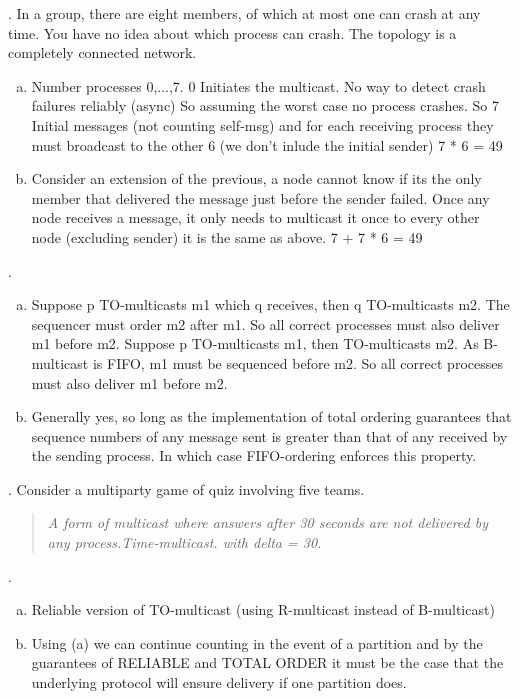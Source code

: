 \documentclass[12pt]{article}
\newcounter{question}
\newcommand{\question}[1]{
    \stepcounter{question}
    \thequestion. #1 \hfill
}
\begin{document}
\question{In a group, there are eight members, of which at most one can crash at any time.  You have no idea about which process can crash. The topology is a completely connected network.}

\begin{enumerate}[(a)]
    \item Number processes 0,...,7. 0 Initiates the multicast. No way to detect crash failures reliably (async) So assuming the worst case no process crashes.  So 7 Initial messages  (not counting self-msg) and for each receiving process they must broadcast to the other 6 (we don't inlude the initial sender) 7 * 6 = 49
    \item Consider an extension of the previous, a node cannot know if its the only member that delivered the message just before the sender failed.  Once any node receives a message, it only needs to multicast it once to every other node (excluding sender) it is the same as above. 7 + 7 * 6 = 49
\end{enumerate}

\pagebreak


\question{}

\begin{enumerate}[(a)]
    \item Suppose p TO-multicasts m1 which q receives, then q TO-multicasts m2. The sequencer must order m2 after m1. So all correct processes must also deliver m1 before m2.  Suppose p TO-multicasts m1, then TO-multicasts m2. As B-multicast is FIFO, m1 must be sequenced before m2. So all correct processes must also deliver m1 before m2.
    \item Generally yes, so long as the implementation of total ordering guarantees that sequence numbers of any message sent is greater than that of any received by the sending process.  In which case FIFO-ordering enforces this property.
\end{enumerate}



\question{Consider a multiparty game of quiz involving five teams.}

\begin{quote}
    \textit{A form of multicast where answers after 30 seconds are not delivered by any process.Time-multicast. with delta = 30.}
\end{quote}

\question{}

\begin{enumerate}[(a)]
    \item Reliable version of TO-multicast (using R-multicast instead of B-multicast)
    \item Using (a) we can continue counting in the event of a partition and by the guarantees of RELIABLE and TOTAL ORDER it must be the case that the underlying protocol will ensure delivery if one partition does.
\end{enumerate}
\end{document}

